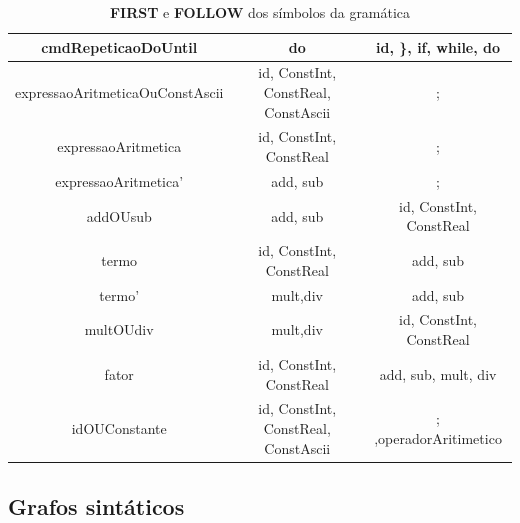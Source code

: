\documentclass[11pt]{article}
\begin{document}
\begin{table}[H]
\begin{tabular}{c|c|c}
        \hline
        cmdRepeticaoDoUntil  & do                                  & id, \}, if, while, do \\
        \hline
        expressaoAritmeticaOuConstAscii & id, ConstInt, ConstReal, ConstAscii & ; \\
        \hline
        expressaoAritmetica  & id, ConstInt, ConstReal & ; \\
        \hline
        expressaoAritmetica' & add, sub                 & ; \\
        \hline
        addOUsub             & add, sub                 & id, ConstInt, ConstReal \\
        \hline
        termo                &  id, ConstInt, ConstReal & add, sub \\
        \hline
        termo'               & mult,div                 & add, sub \\
        \hline
        multOUdiv            & mult,div                 & id, ConstInt, ConstReal \\
        \hline
        fator           &  id, ConstInt, ConstReal                 & add, sub, mult, div \\
        \hline
        idOUConstante        & id, ConstInt, ConstReal, ConstAscii &  ; ,operadorAritimetico \\
        \hline
    \end{tabular}
    \caption{\textbf{FIRST} e \textbf{FOLLOW} dos símbolos da gramática}
\end{table}


\subsection*{Grafos sintáticos}
\end{document}
